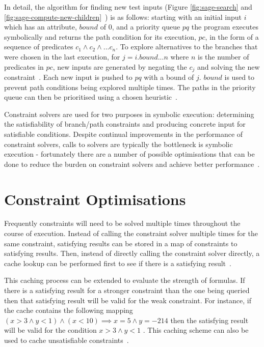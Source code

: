 \documentclass[]{final_report}
\begin{document}
In detail, the algorithm for finding new test inputs (Figure \ref{fig:sage-search} and \ref{fig:sage-compute-new-children}~\cite{godefroid2008automated}) is as follows: starting with an initial input $i$ which has an attribute, $bound$ of 0, and a priority queue $pq$ the program executes symbolically and returns the path condition for its execution, $pc$, in the form of a sequence of predicates $c_1 \land c_2 \land ... c_n $.  To explore alternatives to the branches that were chosen in the last execution, for $j = i.bound ... n$ where $n$ is the number of predicates in $pc$,  new inputs are generated by negating the $c_j$ and solving the new constraint~\cite{godefroid2005dart, godefroid2008grammar}. Each new input is pushed to $pq$ with a bound of $j$. $bound$ is used to prevent path conditions being explored multiple times. The paths in the priority queue can then be prioritised using a chosen heuristic~\cite{cadar2013symbolic}. 

Constraint solvers are used for two purposes in symbolic execution: determining the satisfiability of branch/path constraints and producing concrete input for satisfiable conditions. Despite continual improvements in the performance of constraint solvers, calls to solvers are typically the bottleneck is symbolic execution - fortunately there are a number of possible optimisations that can be done to reduce the burden on constraint solvers and achieve better performance~\cite{cadar2013symbolic}.

\section{Constraint Optimisations}
Frequently constraints will need to be solved multiple times throughout the course of execution. Instead of calling the constraint solver multiple times for the same constraint, satisfying results can be stored in a map of constraints to satisfying results. Then, instead of directly calling the constraint solver directly, a cache lookup can be performed first to see if there is a satisfying result~\cite{cadar2008klee}.

This caching process can be extended to evaluate the strength of formulas. If there is a satisfying result for a stronger constraint than the one being queried then that satisfying result will be valid for the weak constraint. For instance, if the cache contains the following mapping $ (x > 3 \land y <1) \land (x < 10) \implies x = 5 \land y =  -214$ then the satisfying result will be valid for the condition $x > 3 \land y < 1 $ . This caching scheme can also be used to cache unsatisfiable constraints~\cite{cadar2008klee}.
\end{document}
